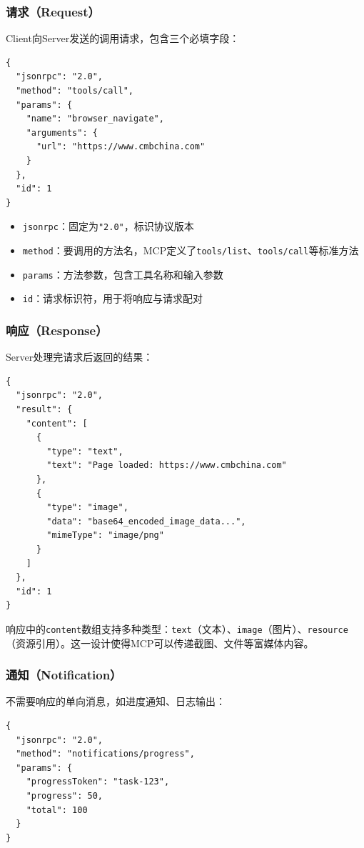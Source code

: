 \subsubsection{请求（Request）}

Client向Server发送的调用请求，包含三个必填字段：

\begin{lstlisting}[style=json]
{
  "jsonrpc": "2.0",
  "method": "tools/call",
  "params": {
    "name": "browser_navigate",
    "arguments": {
      "url": "https://www.cmbchina.com"
    }
  },
  "id": 1
}
\end{lstlisting}

\begin{itemize}[leftmargin=2em]
  \item \texttt{jsonrpc}：固定为\texttt{"2.0"}，标识协议版本
  \item \texttt{method}：要调用的方法名，MCP定义了\texttt{tools/list}、\texttt{tools/call}等标准方法
  \item \texttt{params}：方法参数，包含工具名称和输入参数
  \item \texttt{id}：请求标识符，用于将响应与请求配对
\end{itemize}

\subsubsection{响应（Response）}

Server处理完请求后返回的结果：

\begin{lstlisting}[style=json]
{
  "jsonrpc": "2.0",
  "result": {
    "content": [
      {
        "type": "text",
        "text": "Page loaded: https://www.cmbchina.com"
      },
      {
        "type": "image",
        "data": "base64_encoded_image_data...",
        "mimeType": "image/png"
      }
    ]
  },
  "id": 1
}
\end{lstlisting}

响应中的\texttt{content}数组支持多种类型：\texttt{text}（文本）、\texttt{image}（图片）、\texttt{resource}（资源引用）。这一设计使得MCP可以传递截图、文件等富媒体内容。

\subsubsection{通知（Notification）}

不需要响应的单向消息，如进度通知、日志输出：

\begin{lstlisting}[style=json]
{
  "jsonrpc": "2.0",
  "method": "notifications/progress",
  "params": {
    "progressToken": "task-123",
    "progress": 50,
    "total": 100
  }
}
\end{lstlisting}

